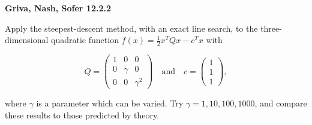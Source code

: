 \textbf{Griva, Nash, Sofer 12.2.2}

Apply the steepest-descent method, with an exact line search, to the three-dimensional quadratic function 
$f(x) = \frac{1}{2} x^T Q x - c^T x$ with

$$
Q = \begin{pmatrix}
    1 & 0      & 0 \\
    0 & \gamma & 0 \\
    0 & 0      & \gamma^2
\end{pmatrix} \quad \text{and} \quad c = \begin{pmatrix}
    1 \\
    1 \\
    1
\end{pmatrix},
$$

where $\gamma$ is a parameter which can be varied. Try $\gamma = 1, 10, 100, 1000$, and compare these results to those
predicted by theory.

\begin{solution}
    \ \\
    \vfill
\end{solution}
